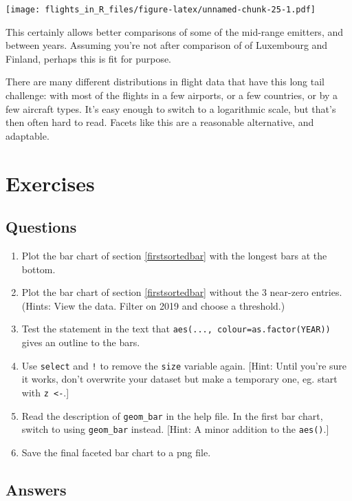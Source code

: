 \documentclass[
]{book}
\providecommand{\tightlist}{%
  \setlength{\itemsep}{0pt}\setlength{\parskip}{0pt}}
\begin{document}
\texttt{[image: flights\_in\_R\_files/figure-latex/unnamed-chunk-25-1.pdf]}

This certainly allows better comparisons of some of the mid-range emitters, and between years. Assuming you're not after comparison of of Luxembourg and Finland, perhaps this is fit for purpose.

There are many different distributions in flight data that have this long tail challenge: with most of the flights in a few airports, or a few countries, or by a few aircraft types. It's easy enough to switch to a logarithmic scale, but that's then often hard to read. Facets like this are a reasonable alternative, and adaptable.

\hypertarget{exercises-1}{%
\section{Exercises}\label{exercises-1}}

\hypertarget{questions-3}{%
\subsection{Questions}\label{questions-3}}

\begin{enumerate}
\def\labelenumi{\arabic{enumi})}
\tightlist
\item
  Plot the bar chart of section \ref{firstsortedbar} with the longest bars at the bottom.
\item
  Plot the bar chart of section \ref{firstsortedbar} without the 3 near-zero entries. (Hints: View the data. Filter on 2019 and choose a threshold.)
\item
  Test the statement in the text that \texttt{aes(...,\ colour=as.factor(YEAR))} gives an outline to the bars.
\item
  Use \texttt{select} and \texttt{!} to remove the \texttt{size} variable again. {[}Hint: Until you're sure it works, don't overwrite your dataset but make a temporary one, eg. start with \texttt{z\ \textless{}-}.{]}
\item
  Read the description of \texttt{geom\_bar} in the help file. In the first bar chart, switch to using \texttt{geom\_bar} instead. {[}Hint: A minor addition to the \texttt{aes()}.{]}
\item
  Save the final faceted bar chart to a png file.
\end{enumerate}

\hypertarget{answers-3}{%
\subsection{Answers}\label{answers-3}}
\end{document}
